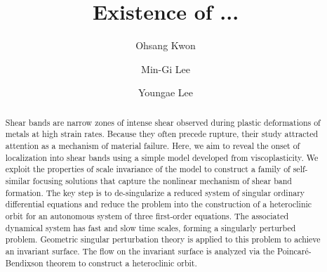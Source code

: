 \documentclass[a4paper,11pt]{article}
\theoremstyle{remark}
\begin{document}
\title{Existence of ...}
\author{Ohsang Kwon\footnotemark[1]\and  Min-Gi Lee\footnotemark[2]
\and Youngae Lee\footnotemark[3]}
\date{}

\maketitle
\renewcommand{\thefootnote}{\fnsymbol{footnote}}

\renewcommand{\thefootnote}{\arabic{footnote}}


\begin{abstract}
Shear bands are narrow zones of intense shear observed during  plastic deformations of metals at high strain rates. Because they often precede rupture, 
their study attracted attention as a mechanism of material failure.  
Here, we aim to reveal the onset of localization into shear bands using a simple model developed from viscoplasticity.
We  exploit the properties of scale invariance of the model to construct a family of self-similar focusing solutions that capture 
the nonlinear mechanism of  shear band formation. The key step is to de-singularize a reduced  system of singular ordinary differential equations 
and reduce the problem into the construction of a heteroclinic orbit for an autonomous system  of three first-order equations. 
The associated  dynamical system has  fast and slow time scales, forming a singularly perturbed problem.  
Geometric singular perturbation theory is applied to this problem to achieve an invariant surface. The flow on
the invariant surface  is analyzed via the Poincar\'{e}-Bendixson theorem to construct a heteroclinic orbit. 
\end{abstract}

% 
\end{document}
